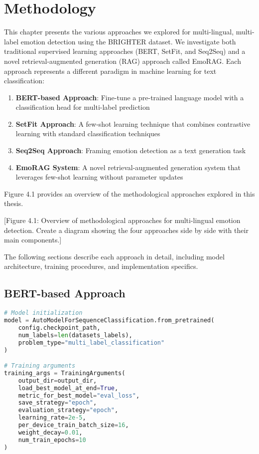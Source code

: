 \documentclass[a4paper,12pt]{extarticle}
\begin{document}
\section{Methodology}

This chapter presents the various approaches we explored for multi-lingual, multi-label emotion detection using the BRIGHTER dataset. We investigate both traditional supervised learning approaches (BERT, SetFit, and Seq2Seq) and a novel retrieval-augmented generation (RAG) approach called EmoRAG. Each approach represents a different paradigm in machine learning for text classification:

\begin{enumerate}
\item \textbf{BERT-based Approach}: Fine-tune a pre-trained language model with a classification head for multi-label prediction
\item \textbf{SetFit Approach}: A few-shot learning technique that combines contrastive learning with standard classification techniques
\item \textbf{Seq2Seq Approach}: Framing emotion detection as a text generation task
\item \textbf{EmoRAG System}: A novel retrieval-augmented generation system that leverages few-shot learning without parameter updates
\end{enumerate}

Figure 4.1 provides an overview of the methodological approaches explored in this thesis.

[Figure 4.1: Overview of methodological approaches for multi-lingual emotion detection. Create a diagram showing the four approaches side by side with their main components.]

The following sections describe each approach in detail, including model architecture, training procedures, and implementation specifics.

\subsection{BERT-based Approach}

\begin{lstlisting}[language=Python]
# Model initialization
model = AutoModelForSequenceClassification.from_pretrained(
    config.checkpoint_path, 
    num_labels=len(datasets_labels),
    problem_type="multi_label_classification"
)

# Training arguments
training_args = TrainingArguments(
    output_dir=output_dir,
    load_best_model_at_end=True,
    metric_for_best_model="eval_loss",
    save_strategy="epoch",
    evaluation_strategy="epoch",
    learning_rate=2e-5,
    per_device_train_batch_size=16,
    weight_decay=0.01,
    num_train_epochs=10
)
\end{lstlisting}
\end{document}
